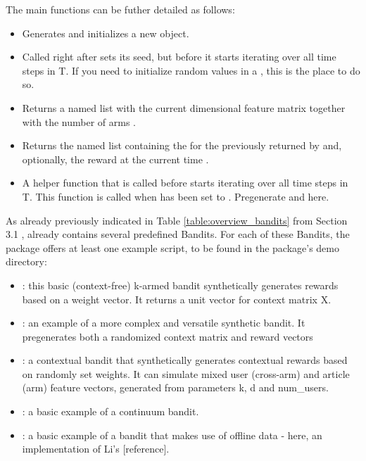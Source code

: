 \documentclass{jss}
\begin{document}
The main  functions can be futher detailed as follows:

\begin{itemize}
  \item{}{ Generates and initializes a new  object. }
  \item{}{
     Called right after  sets its seed,
     but before it starts iterating over all time steps  in T. If you need to initialize random values in a ,
     this is the place to do so.
  }
  \item{}{
     Returns a named list 
     with the current  dimensional  feature matrix  together with the number of arms .
 }
  \item{}{
     Returns the named list  containing the 
     for the  previously returned by  and,
     optionally, the  reward
     at the current time .
 }
  \item{}{
     A helper function that is called before  starts iterating over all time steps  in T.
     This function is called when  has been set to .
     Pregenerate  and  here.
  }
\end{itemize}

As already previously indicated in Table \ref{table:overview_bandits} from Section 3.1 ,  already contains several predefined Bandits. For each of these Bandits, the package offers at least one example script, to be found in the package’s demo directory:

\begin{itemize}
         \item {}: this basic (context-free) k-armed bandit synthetically generates rewards based on a weight vector. It returns a unit vector for context matrix X.
                  \item {}: an example of a more complex and versatile synthetic bandit. It pregenerates both a randomized context matrix and reward vectors
         \item {}: a contextual bandit that synthetically generates contextual rewards based on randomly set weights. It can simulate mixed user (cross-arm) and article (arm) feature vectors, generated from parameters k, d and num\_users.
         \item {}: a basic example of a continuum bandit.
         \item {}: a basic example of a bandit that makes use of offline data - here, an implementation of Li's [reference].
\end{itemize}
\end{document}
